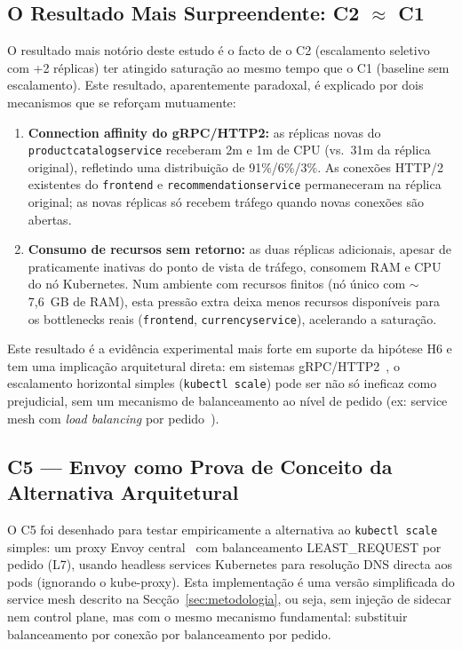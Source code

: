 \documentclass[manuscript,screen,review]{acmart}
\begin{document}
\subsection{O Resultado Mais Surpreendente: C2 $\approx$ C1}

O resultado mais notório deste estudo é o facto de o C2 (escalamento seletivo com +2 réplicas) ter atingido saturação ao mesmo tempo que o C1 (baseline sem escalamento). Este resultado, aparentemente paradoxal, é explicado por dois mecanismos que se reforçam mutuamente:

\begin{enumerate}
  \item \textbf{Connection affinity do gRPC/HTTP2:} as réplicas novas do \texttt{productcatalogservice} receberam 2m e 1m de CPU (vs.\ 31m da réplica original), refletindo uma distribuição de 91\%/6\%/3\%. As conexões HTTP/2 existentes do \texttt{frontend} e \texttt{recommendationservice} permaneceram na réplica original; as novas réplicas só recebem tráfego quando novas conexões são abertas.

  \item \textbf{Consumo de recursos sem retorno:} as duas réplicas adicionais, apesar de praticamente inativas do ponto de vista de tráfego, consomem RAM e CPU do nó Kubernetes. Num ambiente com recursos finitos (nó único com $\sim$7,6~GB de RAM), esta pressão extra deixa menos recursos disponíveis para os bottlenecks reais (\texttt{frontend}, \texttt{currencyservice}), acelerando a saturação.
\end{enumerate}

Este resultado é a evidência experimental mais forte em suporte da hipótese H6 e tem uma implicação arquitetural direta: em sistemas gRPC/HTTP2~\cite{grpcloadbalancing}, o escalamento horizontal simples (\texttt{kubectl scale}) pode ser não só ineficaz como prejudicial, sem um mecanismo de balanceamento ao nível de pedido (ex: service mesh com \textit{load balancing} por pedido~\cite{k8sgrpc}).

\subsection{C5 — Envoy como Prova de Conceito da Alternativa Arquitetural}

O C5 foi desenhado para testar empiricamente a alternativa ao \texttt{kubectl scale} simples: um proxy Envoy central~\cite{grpcloadbalancing} com balanceamento LEAST\_REQUEST por pedido (L7), usando headless services Kubernetes para resolução DNS directa aos pods (ignorando o kube-proxy). Esta implementação é uma versão simplificada do service mesh descrito na Secção~\ref{sec:metodologia}, ou seja, sem injeção de sidecar nem control plane, mas com o mesmo mecanismo fundamental: substituir balanceamento por conexão por balanceamento por pedido.
\end{document}
